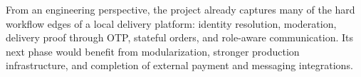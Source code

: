 \documentclass[12pt,a4paper]{article}
\begin{document}
From an engineering perspective, the project already captures many of the hard workflow edges of a local delivery platform: identity resolution, moderation, delivery proof through OTP, stateful orders, and role-aware communication. Its next phase would benefit from modularization, stronger production infrastructure, and completion of external payment and messaging integrations.
\end{document}
